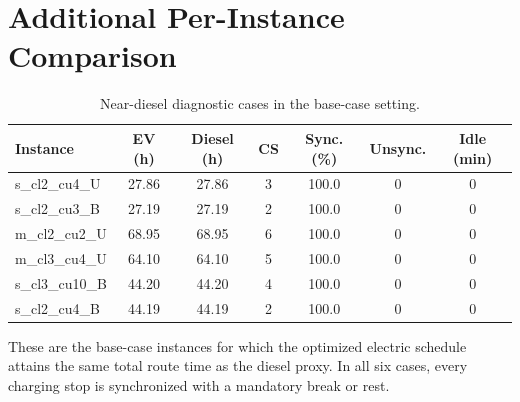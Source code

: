 \documentclass[3p,11pt,authoryear]{elsarticle}  %
\begin{document}
\newpage
\section{Additional Per-Instance Comparison}
\label{appendix:diagnostics}


\begin{table}[!htbp]
\centering
\caption{Near-diesel diagnostic cases in the base-case setting.}
\label{tab:near_diesel_cases}
\begin{threeparttable}
\small
\setlength{\tabcolsep}{3.5pt}
\renewcommand{\arraystretch}{1.1}
\begin{tabular}{
p{4.0cm}
S[table-format=2.2]
S[table-format=2.2]
S[table-format=1.0]
S[table-format=3.1]
S[table-format=1.0]
S[table-format=3.0]
}
\toprule
Instance & {EV (h)} & {Diesel (h)} & {CS} & {Sync. (\%)} & {Unsync.} & {Idle (min)} \\
\midrule
s\_cl2\_cu4\_U & 27.86 & 27.86 & 3 & 100.0 & 0 & 0 \\
s\_cl2\_cu3\_B   & 27.19 & 27.19 & 2 & 100.0 & 0 & 0 \\
m\_cl2\_cu2\_U   & 68.95 & 68.95 & 6 & 100.0 & 0 & 0 \\
m\_cl3\_cu4\_U   & 64.10 & 64.10 & 5 & 100.0 & 0 & 0 \\
s\_cl3\_cu10\_B  & 44.20 & 44.20 & 4 & 100.0 & 0 & 0 \\
s\_cl2\_cu4\_B   & 44.19 & 44.19 & 2 & 100.0 & 0 & 0 \\
\bottomrule
\end{tabular}
\begin{tablenotes}[flushleft]
\footnotesize
\item These are the base-case instances for which the optimized electric schedule attains the same total route time as the diesel proxy. In all six cases, every charging stop is synchronized with a mandatory break or rest.
\end{tablenotes}
\end{threeparttable}
\end{table}
\end{document}
